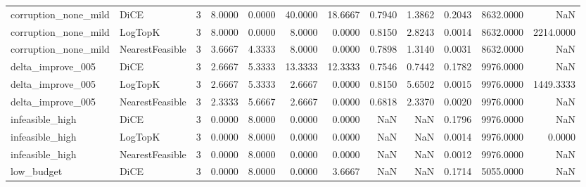 \begin{tabular}{llrrrrrrrrrr}
corruption\_none\_mild &            DiCE &      3 &            8.0000 &          0.0000 &         40.0000 &       18.6667 &             0.7940 &         1.3862 &       0.2043 &          8632.0000 &                   NaN \\
corruption\_none\_mild &         LogTopK &      3 &            8.0000 &          0.0000 &          8.0000 &        0.0000 &             0.8150 &         2.8243 &       0.0014 &          8632.0000 &             2214.0000 \\
corruption\_none\_mild & NearestFeasible &      3 &            3.6667 &          4.3333 &          8.0000 &        0.0000 &             0.7898 &         1.3140 &       0.0031 &          8632.0000 &                   NaN \\
   delta\_improve\_005 &            DiCE &      3 &            2.6667 &          5.3333 &         13.3333 &       12.3333 &             0.7546 &         0.7442 &       0.1782 &          9976.0000 &                   NaN \\
   delta\_improve\_005 &         LogTopK &      3 &            2.6667 &          5.3333 &          2.6667 &        0.0000 &             0.8150 &         5.6502 &       0.0015 &          9976.0000 &             1449.3333 \\
   delta\_improve\_005 & NearestFeasible &      3 &            2.3333 &          5.6667 &          2.6667 &        0.0000 &             0.6818 &         2.3370 &       0.0020 &          9976.0000 &                   NaN \\
     infeasible\_high &            DiCE &      3 &            0.0000 &          8.0000 &          0.0000 &        0.0000 &                NaN &            NaN &       0.1796 &          9976.0000 &                   NaN \\
     infeasible\_high &         LogTopK &      3 &            0.0000 &          8.0000 &          0.0000 &        0.0000 &                NaN &            NaN &       0.0014 &          9976.0000 &                0.0000 \\
     infeasible\_high & NearestFeasible &      3 &            0.0000 &          8.0000 &          0.0000 &        0.0000 &                NaN &            NaN &       0.0012 &          9976.0000 &                   NaN \\
          low\_budget &            DiCE &      3 &            0.0000 &          8.0000 &          0.0000 &        3.6667 &                NaN &            NaN &       0.1714 &          5055.0000 &                   NaN \\

\end{tabular}

